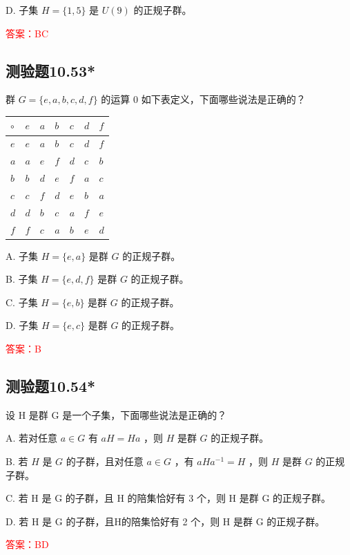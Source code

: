 \documentclass[UTF8, heading=true]{ctexart}
\begin{document}
D. 子集 $H=\{1,5\}$ 是 $U(9)$ 的正规子群。

\textcolor{red}{答案：BC}

\subsection{测验题10.53*}

群 $G=\{e, a, b, c, d, f\}$ 的运算 0 如下表定义，下面哪些说法是正确的？

\begin{table}[H]
  \renewcommand{\arraystretch}{1.5}
  \centering
\begin{tabular}{l|llllll}
\hline$\circ$ & $e$ & $a$ & $b$ & $c$ & $d$ & $f$ \\
\hline$e$ & $e$ & $a$ & $b$ & $c$ & $d$ & $f$ \\
$a$ & $a$ & $e$ & $f$ & $d$ & $c$ & $b$ \\
$b$ & $b$ & $d$ & $e$ & $f$ & $a$ & $c$ \\
$c$ & $c$ & $f$ & $d$ & $e$ & $b$ & $a$ \\
$d$ & $d$ & $b$ & $c$ & $a$ & $f$ & $e$ \\
$f$ & $f$ & $c$ & $a$ & $b$ & $e$ & $d$ \\
\hline
\end{tabular}
\end{table}

A. 子集 $H=\{e, a\}$ 是群 $G$ 的正规子群。

B. 子集 $H=\{e, d, f\}$ 是群 $G$ 的正规子群。

C. 子集 $H=\{e, b\}$ 是群 $G$ 的正规子群。

D. 子集 $H=\{e, c\}$ 是群 $G$ 的正规子群。

\textcolor{red}{答案：B}

\subsection{测验题10.54*}

设 H 是群 G 是一个子集，下面哪些说法是正确的？

A. 若对任意 $a \in G$ 有 $a H=H a$ ，则 $H$ 是群 $G$ 的正规子群。

B. 若 $H$ 是 $G$ 的子群，且对任意 $a \in G$ ，有 $a H a^{-1}=H$ ，则 $H$ 是群 $G$ 的正规子群。

C. 若 H 是 G 的子群，且 H 的陪集恰好有 3 个，则 H 是群 G 的正规子群。

D. 若 H 是 G 的子群，且H的陪集恰好有 2 个，则 H 是群 G 的正规子群。

\textcolor{red}{答案：BD}
\end{document}
